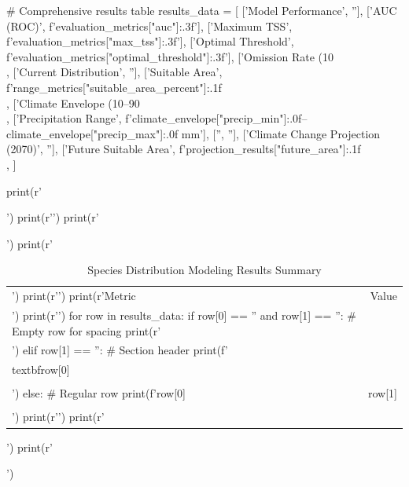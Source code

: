 \documentclass[11pt,a4paper]{article}
\begin{document}
\begin{pycode}
# Comprehensive results table
results_data = [
    ['Model Performance', ''],
    ['AUC (ROC)', f'{evaluation_metrics["auc"]:.3f}'],
    ['Maximum TSS', f'{evaluation_metrics["max_tss"]:.3f}'],
    ['Optimal Threshold', f'{evaluation_metrics["optimal_threshold"]:.3f}'],
    ['Omission Rate (10\\%
    ['', ''],
    ['Current Distribution', ''],
    ['Suitable Area', f'{range_metrics["suitable_area_percent"]:.1f}\\%
    ['High Suitability', f'{range_metrics["high_suitability_percent"]:.1f}\\%
    ['Moderate Suitability', f'{range_metrics["moderate_suitability_percent"]:.1f}\\%
    ['', ''],
    ['Climate Envelope (10--90\\%
    ['Temperature Range', f'{climate_envelope["temp_min"]:.1f}--{climate_envelope["temp_max"]:.1f}°C'],
    ['Precipitation Range', f'{climate_envelope["precip_min"]:.0f}--{climate_envelope["precip_max"]:.0f} mm'],
    ['', ''],
    ['Climate Change Projection (2070)', ''],
    ['Future Suitable Area', f'{projection_results["future_area"]:.1f}\\%
    ['Range Change', f'{projection_results["range_change_percent"]:+.1f}\\%
    ['Elevational Shift', f'{projection_results["elevation_shift_m"]:+.0f} m'],
]

print(r'\begin{table}[H]')
print(r'\centering')
print(r'\caption{Species Distribution Modeling Results Summary}')
print(r'\begin{tabular}{@{}lr@{}}')
print(r'\toprule')
print(r'Metric & Value \\')
print(r'\midrule')
for row in results_data:
    if row[0] == '' and row[1] == '':
        # Empty row for spacing
        print(r'\\[-0.5em]')
    elif row[1] == '':
        # Section header
        print(f'\\textbf{{{row[0]}}} & \\\\')
    else:
        # Regular row
        print(f'{row[0]} & {row[1]} \\\\')
print(r'\bottomrule')
print(r'\end{tabular}')
print(r'\end{table}')
\end{pycode}
\end{document}
